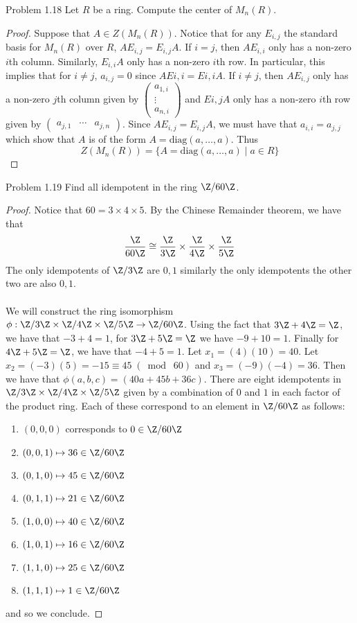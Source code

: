 \documentclass[a4paper]{article}
\begin{document}
\begin{ex}{Problem 1.18}{} Let $R$ be a ring. Compute the center of $M_n(R)$. \tcbline
\begin{proof}
Suppose that $A\in Z(M_n(R))$. Notice that for any $E_{i,j}$ the standard basis for $M_n(R)$ over $R$, $AE_{i,j}=E_{i,j}A$. If $i=j$, then $AE_{i,i}$ only has a non-zero $i$th column. Similarly, $E_{i,i}A$ only has a non-zero $i$th row. In particular, this implies that for $i\neq j$, $a_{i,j}=0$ since $AE{i,i}=E{i,i}A$. If $i\neq j$, then $AE_{i,j}$ only has a non-zero $j$th column given by $\begin{pmatrix}
a_{1,i}\\\vdots\\ a_{n,i}
\end{pmatrix}$ and $E{i,j}A$ only has a non-zero $i$th row given by $\begin{pmatrix}
a_{j,1} & \cdots & a_{j,n}
\end{pmatrix}$. Since $AE_{i,j}=E_{i,j}A$, we must have that $a_{i,i}=a_{j,j}$ which show that $A$ is of the form $A=\text{diag}(a,\dots,a)$. Thus $$Z(M_n(R))=\{A=\text{diag}(a,\dots,a)\;|\;a\in R\}$$
\end{proof}
\end{ex}

\begin{ex}{Problem 1.19}{} Find all idempotent in the ring $\Z/60\Z$. \tcbline
\begin{proof}
Notice that $60=3\times 4\times 5$. By the Chinese Remainder theorem, we have that $$\frac{\Z}{60\Z}\cong\frac{\Z}{3\Z}\times\frac{\Z}{4\Z}\times\frac{\Z}{5\Z}$$ The only idempotents of $\Z/3\Z$ are $0,1$ similarly the only idempotents the other two are also $0,1$. \\~\\

We will construct the ring isomorphism $\phi:\Z/3\Z\times\Z/4\Z\times\Z/5\Z\to\Z/60\Z$. Using the fact that $3\Z+4\Z=\Z$, we have that $-3+4=1$, for $3\Z+5\Z=\Z$ we have $-9+10=1$. Finally for $4\Z+5\Z=\Z$, we have that $-4+5=1$. Let $x_1=(4)(10)=40$. Let $x_2=(-3)(5)=-15\equiv 45\;(\bmod\;60)$ and $x_3=(-9)(-4)=36$. Then we have that $\phi(a,b,c)=(40a+45b+36c)$. There are eight idempotents in $\Z/3\Z\times\Z/4\Z\times\Z/5\Z$ given by a combination of $0$ and $1$ in each factor of the product ring. Each of these correspond to an element in $\Z/60\Z$ as follows: 
\begin{enumerate}
\item $(0,0,0)$ corresponds to $0\in\Z/60\Z$
\item $(0,0,1)\mapsto 36\in\Z/60\Z$
\item $(0,1,0)\mapsto 45\in\Z/60\Z$
\item $(0,1,1)\mapsto 21\in\Z/60\Z$
\item $(1,0,0)\mapsto 40\in\Z/60\Z$
\item $(1,0,1)\mapsto 16\in\Z/60\Z$
\item $(1,1,0)\mapsto 25\in\Z/60\Z$
\item $(1,1,1)\mapsto 1\in\Z/60\Z$
\end{enumerate}
and so we conclude. 
\end{proof}
\end{ex}
\end{document}
